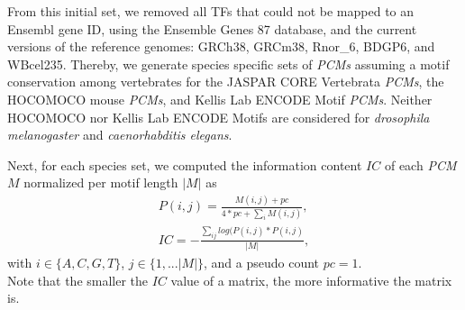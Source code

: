 \documentclass{article}
\begin{document}
From this initial set, we removed all TFs that could not be mapped to an Ensembl gene ID, using the Ensemble Genes 87 database, 
and the current versions of the reference genomes: GRCh38, GRCm38, Rnor\_6, BDGP6, and WBcel235. 
Thereby, we generate species specific sets of \textit{PCMs} assuming a motif conservation
among vertebrates for the JASPAR CORE Vertebrata \textit{PCMs}, the HOCOMOCO mouse \textit{PCMs}, and Kellis Lab ENCODE Motif \textit{PCMs}.
Neither HOCOMOCO nor Kellis Lab ENCODE Motifs are considered for \textit{drosophila melanogaster} and \textit{caenorhabditis elegans}.

Next, for each species set, we computed the information content $IC$ of each \textit{PCM} $M$  normalized per motif length $|M|$ as
\begin{align}
P(i,j)= \frac{M(i,j)+pc}{4*pc+\sum_{i}M(i,j)}, \\
IC=-\frac{\sum_{ij}log(P(i,j)*P(i,j)}{|M|},
\end{align}
with $i \in \{A,C,G,T\}$, $j \in \{1,...|M|\}$, and a pseudo count $pc=1$.
\bigskip
\\Note that the smaller the $IC$ value of a matrix, the more informative the matrix is.
\end{document}
